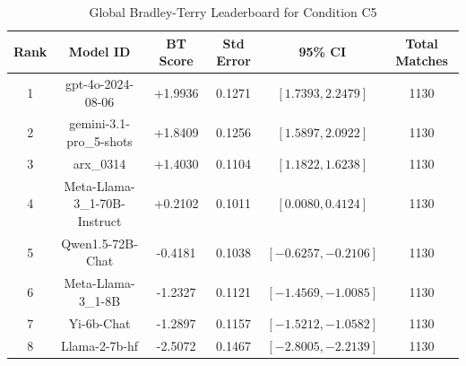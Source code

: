 \begin{table}[ht]
\centering
\caption{Global Bradley-Terry Leaderboard for Condition \textsc{C5}}
\label{tab:leaderboard_c5}
\begin{tabular}{cccccc}
\hline
\textbf{Rank} & \textbf{Model ID} & \textbf{BT Score} & \textbf{Std Error} & \textbf{95\% CI} & \textbf{Total Matches} \\
\hline
1 & gpt-4o-2024-08-06 & +1.9936 & 0.1271 & $[1.7393, 2.2479]$ & 1130 \\
2 & gemini-3.1-pro\_5-shots & +1.8409 & 0.1256 & $[1.5897, 2.0922]$ & 1130 \\
3 & arx\_0314 & +1.4030 & 0.1104 & $[1.1822, 1.6238]$ & 1130 \\
4 & Meta-Llama-3\_1-70B-Instruct & +0.2102 & 0.1011 & $[0.0080, 0.4124]$ & 1130 \\
5 & Qwen1.5-72B-Chat & -0.4181 & 0.1038 & $[-0.6257, -0.2106]$ & 1130 \\
6 & Meta-Llama-3\_1-8B & -1.2327 & 0.1121 & $[-1.4569, -1.0085]$ & 1130 \\
7 & Yi-6b-Chat & -1.2897 & 0.1157 & $[-1.5212, -1.0582]$ & 1130 \\
8 & Llama-2-7b-hf & -2.5072 & 0.1467 & $[-2.8005, -2.2139]$ & 1130 \\
\hline
\end{tabular}
\end{table}
